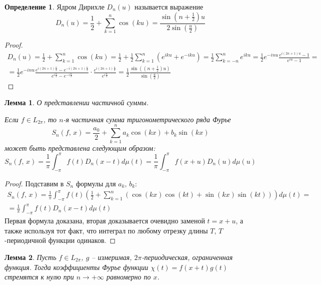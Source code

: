 \documentclass[a4paper,12pt]{article}
\theoremstyle{plain}
\newtheorem{lemma}{Лемма}[section]
\theoremstyle{definition}
\newtheorem{definition}{Определение}[section]
\theoremstyle{remark}
\begin{document}
\begin{definition}
	Ядром Дирихле $D_n(u)$ называется выражение
	\[D_n(u) = \frac{1}{2} + \sum_{k = 1}^n \cos(ku) = \frac{\sin (n + \frac{1}{2})u}{2\sin(\frac{u}{2})}\]
\end{definition}

\begin{proof}
	\begin{align*}
		D_n(u) = \frac{1}{2} + \sum_{k = 1}^n \cos(ku) = \frac{1}{2} + \frac{1}{2}\sum_{k = 1}^n (e^{iku} + e^{-iku}) = \frac{1}{2}\sum_{k = -n}^n e^{iku} = \frac{1}{2}e^{-inu}\frac{e^{i(2n + 1)u} - 1}{e^{iu} - 1} = \\
		= \frac{1}{2}e^{-inu}\frac{e^{i(2n + 1)\frac{u}{2}} - e^{-i(2n + 1)\frac{u}{2}}}{e^{i\frac{u}{2}} - e^{-i\frac{u}{2}}}\cdot\frac{e^{i(2n + 1)\frac{u}{2}}}{e^{i\frac{u}{2}}} = \frac{1}{2}\frac{\sin((n + \frac{1}{2})u)}{\sin(\frac{u}{2})}
	\end{align*}
\end{proof}

\begin{lemma}
	О представлении частичной суммы.

	Если $f \in L_{2\pi}$, то $n$-я частичная сумма тригонометрического ряда Фурье
	\[S_n(f,\,x) = \frac{a_0}{2} + \sum_{k = 1}^n a_k \cos(kx) + b_k\sin(kx)\]
	может быть представлена следующим образом:
	\[S_n(f,\,x) = \frac{1}{\pi}\int_{-\pi}^\pi f(t)D_n(x - t)d\mu(t) = \frac{1}{\pi}\int_{-\pi}^\pi f(x + u)D_n(u)d\mu(u)\]
\end{lemma}

\begin{proof}
	Подставим в $S_n$ формулы для $a_k,\, b_k$:
	\begin{align*}
		S_n(f,\,x) = \frac{1}{\pi}\int_{-\pi}^\pi f(t) \left(\frac{1}{2} + \sum_{k = 1}^n (\cos(kx)\cos(kt) + \sin(kx)\sin(kt))\right)d\mu(t) = \\
		= \frac{1}{\pi}\int_{-\pi}^\pi f(t)D_n(x-t)d\mu(t)
	\end{align*}
	Первая формула доказана, вторая доказывается очевидно заменой $t = x + u$, а также используя тот факт, что интеграл по любому отрезку длины $T$, $T$-периодичной функции одинаков.
\end{proof}

\begin{lemma}
	\label{RAVN_COEF}
	Пусть $f \in L_{2\pi}$, $g$ -- измеримая, $2\pi$-периодическая, ограниченная функция. Тогда коэффициенты Фурье функции $\chi(t) = f(x + t)g(t)$ стремятся к нулю при $n \to +\infty$ равномерно по $x$.
\end{lemma}
\end{document}

